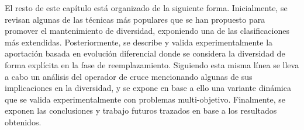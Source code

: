 El resto de este capítulo está organizado de la siguiente forma.
%
Inicialmente, se revisan algunas de las técnicas más populares que se han propuesto para promover el mantenimiento de diversidad, exponiendo una de las clasificaciones más extendidas.
%
Posteriormente, se describe y valida experimentalmente la aportación basada en evolución diferencial donde se considera la diversidad de forma explícita en la fase de reemplazamiento.
%
Siguiendo esta misma línea se lleva a cabo un análisis del operador de cruce \SBX{} mencionando algunas de sus implicaciones en la diversidad, 
y se expone en base a ello una variante dinámica que se valida experimentalmente con problemas multi-objetivo.
%
Finalmente, se exponen las conclusiones y trabajo futuros trazados en base a los resultados obtenidos.
%
